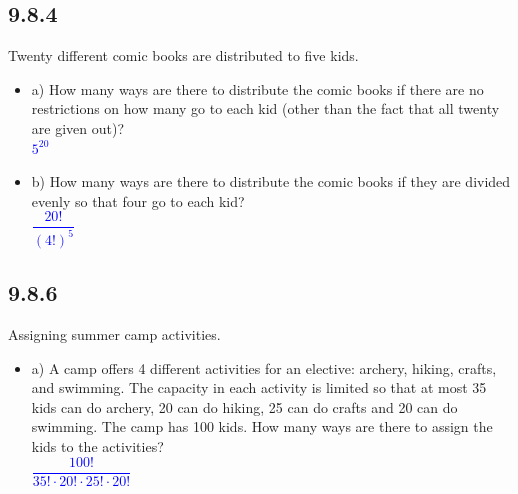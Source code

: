 \documentclass{article}
\begin{document}
\subsection*{9.8.4} Twenty different comic books are distributed to five kids.
\begin{itemize}
    \item a) How many ways are there to distribute the comic books if there are no restrictions on how many go to each kid (other than the fact that all twenty are given out)? \\
    \textcolor{blue}{$5^{20}$}
    \item b) How many ways are there to distribute the comic books if they are divided evenly so that four go to each kid? \\
    \textcolor{blue}{$\dfrac{20!}{(4!)^5}$}
\end{itemize}

\subsection*{9.8.6} Assigning summer camp activities.
\begin{itemize}
    \item a) A camp offers 4 different activities for an elective: archery, hiking, crafts, and swimming. The capacity in each activity is limited so that at most 35 kids can do archery, 20 can do hiking, 25 can do crafts and 20 can do swimming. The camp has 100 kids. How many ways are there to assign the kids to the activities?\\
    \textcolor{blue}{$\dfrac{100!}{35! \cdot 20! \cdot 25! \cdot 20!}$}
\end{itemize}
\end{document}
